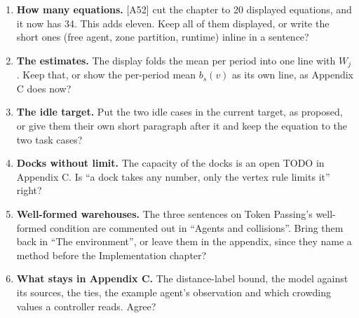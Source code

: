 \documentclass[11pt,a4paper]{article}
\begin{document}
\begin{enumerate}[leftmargin=1.4em]
  \item \textbf{How many equations.} [A52] cut the chapter to 20 displayed
    equations, and it now has 34. This adds eleven. Keep all of them
    displayed, or write the short ones (free agent, zone partition, runtime)
    inline in a sentence?
  \item \textbf{The estimates.} The display folds the mean per period into
    one line with $W_j$. Keep that, or show the per-period mean $b_s(v)$ as
    its own line, as Appendix C does now?
  \item \textbf{The idle target.} Put the two idle cases in the current
    target, as proposed, or give them their own short paragraph after it and
    keep the equation to the two task cases?
  \item \textbf{Docks without limit.} The capacity of the docks is an open
    TODO in Appendix C. Is ``a dock takes any number, only the vertex rule
    limits it'' right?
  \item \textbf{Well-formed warehouses.} The three sentences on Token
    Passing's well-formed condition are commented out in ``Agents and
    collisions''. Bring them back in ``The environment'', or leave them in the
    appendix, since they name a method before the Implementation chapter?
  \item \textbf{What stays in Appendix C.} The distance-label bound, the
    model against its sources, the ties, the example agent's observation and
    which crowding values a controller reads. Agree?
\end{enumerate}
\end{document}
